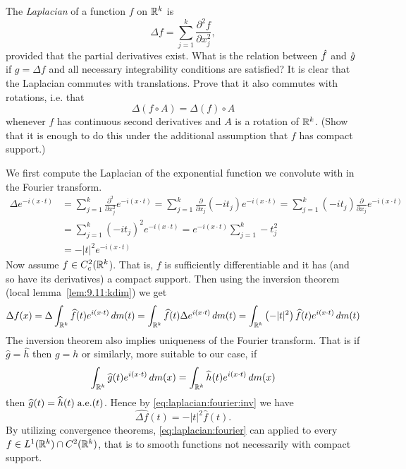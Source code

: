 \begin{enumerate}

\begin{excopy}
The
\emph{Laplacian} 
of a function $f$ on \(\mathbb{R}^k\) is 
\begin{equation*}
\Delta f = \sum_{j=1}^k \frac{\partial^2f}{\partial x_j^2},
\end{equation*}
provided that the partial derivatives exist. What is the relation between 
\(\Hat{f}\) and \(\Hat{g}\) if \(g = \Delta f\)
and all necessary integrability conditions are satisfied?
It is clear that the Laplacian commutes with translations.
Prove that it also commutes with rotations, i.e. that 
\begin{equation*}
 \Delta(f \circ A) =  \Delta(f) \circ A
\end{equation*}
whenever $f$ has continuous second derivatives 
and $A$ is a rotation of \(\mathbb{R}^k\).
(Show that it is enough to do this under the additional assumption 
that $f$ has compact support.)
\end{excopy}

We first compute the 
Laplacian of the exponential 
function we convolute with in the Fourier transform.
\begin{align*}
\Delta e^{-i(x\cdot t)}
&= \sum_{j=1}^k \frac{\partial^2}{\partial x_j^2} e^{-i(x\cdot t)} 
 = \sum_{j=1}^k \frac{\partial}{\partial x_j} (-it_j) e^{-i(x\cdot t)} 
 = \sum_{j=1}^k (-it_j) \frac{\partial}{\partial x_j} e^{-i(x\cdot t)} \\
&= \sum_{j=1}^k (-it_j)^2 e^{-i(x\cdot t)} 
 = e^{-i(x\cdot t)} \sum_{j=1}^k -t_j^2  \\
&= -|t|^2e^{-i(x\cdot t)}
\end{align*}
Now assume \(f\in C_c^2(\mathbb{R}^k\)). 
That is, $f$ is sufficiently differentiable 
and it has (and so have its  derivatives) a compact support. Then
using the inversion theorem (local lemma~\ref{lem:9.11:kdim}) we get
\begin{equation*}  \label{eq:laplacian:fourier:inv}
\Delta f(x)
 = \Delta\int_{\mathbb{R}^k} \widehat{f}(t) e^{i(x\cdot t)}\,dm(t) 
 = \int_{\mathbb{R}^k} \widehat{f}(t) \Delta e^{i(x\cdot t)}\,dm(t) 
 = \int_{\mathbb{R}^k} \left(-|t|^2\right)\widehat{f}(t) e^{i(x\cdot t)}\,dm(t)
\end{equation*}
The inversion theorem also implies uniqueness of the Fourier transform.
That is if \(\widehat{g} = \widehat{h}\) then \(g=h\)
or similarly, more suitable to our case, if
\begin{equation}
\int_{\mathbb{R}^k}\widehat{g}(t)e^{i(x\cdot t)}\,dm(x) =
\int_{\mathbb{R}^k}\widehat{h}(t)e^{i(x\cdot t)}\,dm(x)
\end{equation}
then \(\widehat{g}(t)=\widehat{h}(t)\;\textrm{a.e.}(t)\).
Hence by \eqref{eq:laplacian:fourier:inv} we have
\begin{equation} \label{eq:laplacian:fourier}
\widehat{\Delta f}(t) = -|t|^2\widehat{f}(t).
\end{equation}
By utilizing convergence theorems, \eqref{eq:laplacian:fourier}
can applied to every \(f\in L^1(\mathbb{R}^k)\cap C^2(\mathbb{R}^k)\),
that is to smooth functions not necessarily with compact support.


\end{enumerate}
